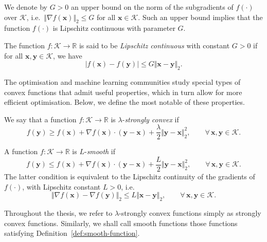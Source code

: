 We denote by $G > 0$ an upper bound on the norm of the subgradients of $f(\cdot)$ over $\mathcal{K}$, i.e.\ $\Vert \nabla f(\mathbf{x})\Vert_2 \leq G$ for all $\mathbf{x} \in \mathcal{K}$. Such an upper bound implies that the function $f(\cdot)$ is Lipschitz continuous with parameter $G$.
\begin{mydef}
\label{def:lipschitz-continuity}
The function $f:\mathcal{K} \rightarrow \mathbb{R}$ is said to be \emph{Lipschitz continuous} with constant $G > 0$ if for all $\mathbf{x}, \mathbf{y} \in \mathcal{K}$, we have
\begin{equation}
|f(\mathbf{x}) - f(\mathbf{y})| \leq G\Vert\mathbf{x} - \mathbf{y}\Vert_2.
\end{equation}
\end{mydef}
The optimisation and machine learning communities study special types of convex functions that admit useful properties, which in turn allow for more efficient optimisation. Below, we define the most notable of these properties.
\begin{mydef}
\label{def:strongly-convex-function}
We say that a function $f : \mathcal{K} \rightarrow \mathbb{R}$ is $\lambda$-\emph{strongly convex} if
\begin{equation}
f(\mathbf{y}) \geq f(\mathbf{x}) + \nabla f(\mathbf{x})\cdot(\mathbf{y} - \mathbf{x}) + \frac{\lambda}{2}\Vert\mathbf{y} - \mathbf{x}\Vert_2^2,
\qquad \forall \, \mathbf{x}, \mathbf{y} \in \mathcal{K}.
\end{equation}
\end{mydef}
\begin{mydef}
\label{def:smooth-function}
A function $f : \mathcal{K} \rightarrow \mathbb{R}$ is $L$-\emph{smooth} if
\begin{equation}
f(\mathbf{y}) \leq f(\mathbf{x}) + \nabla f(\mathbf{x})\cdot(\mathbf{y} - \mathbf{x}) + \frac{L}{2}\Vert\mathbf{y} - \mathbf{x}\Vert_2^2,
\qquad \forall \, \mathbf{x}, \mathbf{y} \in \mathcal{K}.
\end{equation}
The latter condition is equivalent to the Lipschitz continuity of the gradients of $f(\cdot)$, with Lipschitz constant $L > 0$, i.e.\
\begin{equation}
\Vert\nabla f(\mathbf{x}) - \nabla f(\mathbf{y})\Vert_2 \leq L\Vert\mathbf{x} - \mathbf{y}\Vert_2,
\qquad \forall \, \mathbf{x}, \mathbf{y} \in \mathcal{K}.
\end{equation}
\end{mydef}
Throughout the thesis, we refer to $\lambda$-strongly convex functions simply as strongly convex functions. Similarly, we shall call smooth functions those functions satisfying Definition~\ref{def:smooth-function}.

